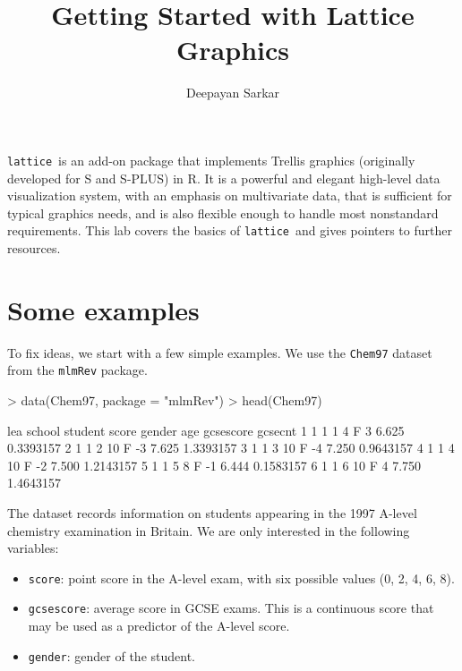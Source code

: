\documentclass[10pt]{article}
\title{Getting Started with Lattice Graphics}
\author{Deepayan Sarkar}
\date{}
\newcommand{\R}{\textsf{R}}
\newcommand{\code}[1]{\texttt{#1}}
\newcommand{\lattice}{\code{lattice}}
\newcommand{\Rpackage}[1]{\code{#1}}
\begin{document}
\maketitle

\raggedright









\lattice\ is an add-on package that implements Trellis graphics
(originally developed for \textsf{S} and \textsf{S-PLUS}) in \R.  It
is a powerful and elegant high-level data visualization system, with
an emphasis on multivariate data, that is sufficient for typical
graphics needs, and is also flexible enough to handle most nonstandard
requirements.  This lab covers the basics of \lattice\ and gives
pointers to further resources.


\section*{Some examples}


To fix ideas, we start with a few simple examples. We use the
\code{Chem97} dataset from the \Rpackage{mlmRev} package.
\begin{Schunk}
\begin{Sinput}
> data(Chem97, package = "mlmRev")
> head(Chem97)
\end{Sinput}
\begin{Soutput}
  lea school student score gender age gcsescore   gcsecnt
1   1      1       1     4      F   3     6.625 0.3393157
2   1      1       2    10      F  -3     7.625 1.3393157
3   1      1       3    10      F  -4     7.250 0.9643157
4   1      1       4    10      F  -2     7.500 1.2143157
5   1      1       5     8      F  -1     6.444 0.1583157
6   1      1       6    10      F   4     7.750 1.4643157
\end{Soutput}
\end{Schunk}
%
The dataset records information on students appearing in the 1997
A-level chemistry examination in Britain.  We are only interested in
the following variables:
\begin{itemize}
\item \code{score}: point score in the A-level exam, with six possible
  values (0, 2, 4, 6, 8).
\item \code{gcsescore}: average score in GCSE exams.  This is a
  continuous score that may be used as a predictor of the A-level
  score.
\item \code{gender}: gender of the student.
\end{itemize}
\end{document}
